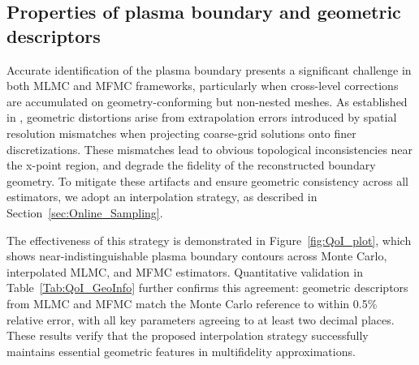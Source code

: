 \subsection{Properties of plasma boundary and geometric descriptors}
Accurate identification of the plasma boundary presents a significant challenge in both MLMC and MFMC frameworks, particularly when cross-level corrections are accumulated on geometry-conforming but non-nested meshes. As established in \cite{ElLiSa:2023}, geometric distortions arise from extrapolation errors introduced by spatial resolution mismatches when projecting coarse-grid solutions onto finer discretizations. These mismatches lead to obvious topological inconsistencies near the x-point region, and degrade the fidelity of the reconstructed boundary geometry. To mitigate these artifacts and ensure geometric consistency across all estimators, we adopt an interpolation strategy, as described in Section~\ref{sec:Online_Sampling}.


The effectiveness of this strategy is demonstrated in Figure~\ref{fig:QoI_plot}, which shows near-indistinguishable plasma boundary contours across Monte Carlo, interpolated MLMC, and MFMC estimators. Quantitative validation in Table~\ref{Tab:QoI_GeoInfo} further confirms this agreement: geometric descriptors from MLMC and MFMC match the Monte Carlo reference to within 0.5\% relative error, with all key parameters agreeing to at least two decimal places. These results verify that the proposed interpolation strategy successfully maintains essential geometric features in multifidelity approximations.














